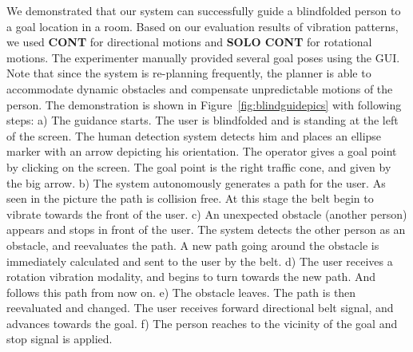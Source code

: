 \documentclass[12pt]{gatech-thesis}
\begin{document}
We demonstrated that our system can successfully guide a blindfolded person to a goal location in a room. Based on our evaluation results of vibration patterns, we used \textbf{CONT} for directional motions and \textbf{SOLO CONT} for rotational motions. The experimenter manually provided several goal poses using the GUI. Note that since the system is re-planning frequently, the planner is able to accommodate dynamic obstacles and compensate unpredictable motions of the person. The demonstration is shown in Figure~\ref{fig:blindguidepics} with following steps:
a) The guidance starts. The user is blindfolded and is standing at the left of the screen. The human detection system detects him and places an ellipse marker with an arrow depicting his orientation. The operator gives a goal point by clicking on the screen. The goal point is the right traffic cone, and given by the big arrow. b) The system autonomously generates a path for the user. As seen in the picture the path is collision free. At this stage the belt begin to vibrate towards the front of the user. c) An unexpected obstacle (another person) appears and stops in front of the user. The system detects the other person as an obstacle, and reevaluates the path. A new path going around the obstacle is immediately calculated and sent to the user by the belt. d) The user receives a rotation vibration modality, and begins to turn towards the new path. And follows this path from now on. e) The obstacle leaves. The path is then reevaluated and changed. The user receives forward directional belt signal, and advances towards the goal. f) The person reaches to the vicinity of the goal and stop signal is applied.
\end{document}

